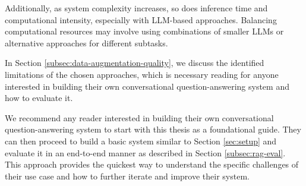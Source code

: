 Additionally, as system complexity increases, so does inference time and computational intensity, especially with LLM-based approaches. Balancing computational resources may involve using combinations of smaller LLMs or alternative approaches for different subtasks.

In Section \ref{subsec:data-augmentation-quality}, we discuss the identified limitations of the chosen approaches, which is necessary reading for anyone interested in building their own conversational question-answering system and how to evaluate it.

\vspace{\baselineskip}
We recommend any reader interested in building their own conversational question-answering system to start with this thesis as a foundational guide. They can then proceed to build a basic system similar to Section \ref{sec:setup} and evaluate it in an end-to-end manner as described in Section \ref{subsec:rag-eval}. This approach provides the quickest way to understand the specific challenges of their use case and how to further iterate and improve their system.

